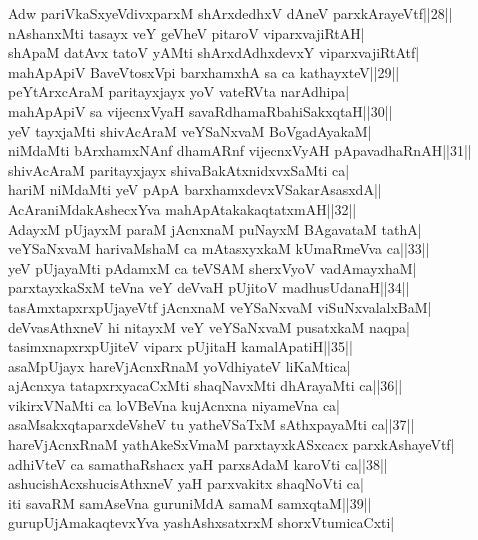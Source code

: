 \documentclass{article}
\begin{document}
Adw pariVkaSxyeVdivxparxM shArxdedhxV dAneV parxkArayeVtf||28||\\
nAshanxMti tasayx veY geVheV pitaroV viparxvajiRtAH|\\
shApaM datAvx tatoV yAMti shArxdAdhxdevxY viparxvajiRtAtf|\\
mahApApiV BaveVtosxVpi barxhamxhA sa ca kathayxteV||29||\\
peYtArxcAraM paritayxjayx yoV vateRVta narAdhipa|\\
mahApApiV sa vijecnxVyaH savaRdhamaRbahiSakxqtaH||30||\\
yeV tayxjaMti shivAcAraM veYSaNxvaM BoVgadAyakaM|\\
niMdaMti bArxhamxNAnf dhamARnf vijecnxVyAH pApavadhaRnAH||31||\\
shivAcAraM paritayxjayx shivaBakAtxnidxvxSaMti ca|\\
hariM niMdaMti yeV pApA barxhamxdevxVSakarAsasxdA||\\
AcAraniMdakAshecxYva mahApAtakakaqtatxmAH||32||\\
AdayxM pUjayxM paraM jAcnxnaM puNayxM BAgavataM tathA|\\
veYSaNxvaM harivaMshaM ca mAtasxyxkaM kUmaRmeVva ca||33||\\
yeV pUjayaMti pAdamxM ca teVSAM sherxVyoV vadAmayxhaM|\\
parxtayxkaSxM teVna veY deVvaH pUjitoV madhusUdanaH||34||\\
tasAmxtapxrxpUjayeVtf jAcnxnaM veYSaNxvaM viSuNxvalalxBaM|\\
deVvasAthxneV hi nitayxM veY veYSaNxvaM pusatxkaM naqpa|\\
tasimxnapxrxpUjiteV viparx pUjitaH kamalApatiH||35||\\
asaMpUjayx hareVjAcnxRnaM yoVdhiyateV liKaMtica|\\
ajAcnxya tatapxrxyacaCxMti shaqNavxMti dhArayaMti ca||36||\\
vikirxVNaMti ca loVBeVna kujAcnxna niyameVna ca|\\
asaMsakxqtaparxdeVsheV tu yatheVSaTxM sAthxpayaMti ca||37||\\
hareVjAcnxRnaM yathAkeSxVmaM parxtayxkASxcacx parxkAshayeVtf|\\
adhiVteV ca samathaRshacx yaH parxsAdaM karoVti ca||38||\\
ashucishAcxshucisAthxneV yaH parxvakitx shaqNoVti ca|\\
iti savaRM samAseVna guruniMdA samaM samxqtaM||39||\\
gurupUjAmakaqtevxYva yashAshxsatxrxM shorxVtumicaCxti|\\
\end{document}
